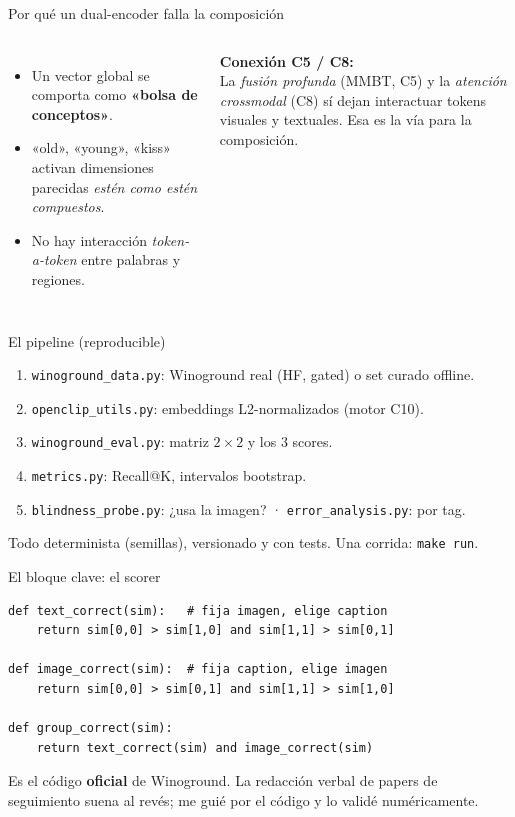 \documentclass[aspectratio=169]{beamer}
\begin{document}
\begin{frame}{Por qué un dual-encoder falla la composición}
  \begin{columns}[T]
    \begin{itemize}
      \item Un vector global se comporta como \textbf{«bolsa de conceptos»}.
      \item «old», «young», «kiss» activan dimensiones parecidas \emph{estén como estén compuestos}.
      \item No hay interacción \emph{token-a-token} entre palabras y regiones.
    \end{itemize}
    \footnotesize\centering
    \textbf{Conexión C5 / C8:}\\[4pt]
    La \emph{fusión profunda} (MMBT, C5) y la \emph{atención crossmodal} (C8)
    sí dejan interactuar tokens visuales y textuales. Esa es la vía para la composición.
  \end{columns}
\end{frame}

\begin{frame}{El pipeline (reproducible)}
  \footnotesize
  \begin{enumerate}
    \item \texttt{winoground\_data.py}: Winoground real (HF, gated) o set curado offline.
    \item \texttt{openclip\_utils.py}: embeddings L2-normalizados (motor C10).
    \item \texttt{winoground\_eval.py}: matriz $2\times2$ y los 3 scores.
    \item \texttt{metrics.py}: Recall@K, intervalos bootstrap.
    \item \texttt{blindness\_probe.py}: ¿usa la imagen? · \texttt{error\_analysis.py}: por tag.
  \end{enumerate}
  \vfill
  Todo determinista (semillas), versionado y con tests. Una corrida: \texttt{make run}.
\end{frame}

\begin{frame}[fragile]{El bloque clave: el scorer}
\begin{verbatim}
def text_correct(sim):   # fija imagen, elige caption
    return sim[0,0] > sim[1,0] and sim[1,1] > sim[0,1]

def image_correct(sim):  # fija caption, elige imagen
    return sim[0,0] > sim[0,1] and sim[1,1] > sim[1,0]

def group_correct(sim):
    return text_correct(sim) and image_correct(sim)
\end{verbatim}
  \footnotesize Es el código \textbf{oficial} de Winoground. La redacción verbal de papers
  de seguimiento suena al revés; me guié por el código y lo validé numéricamente.
\end{frame}
\end{document}
